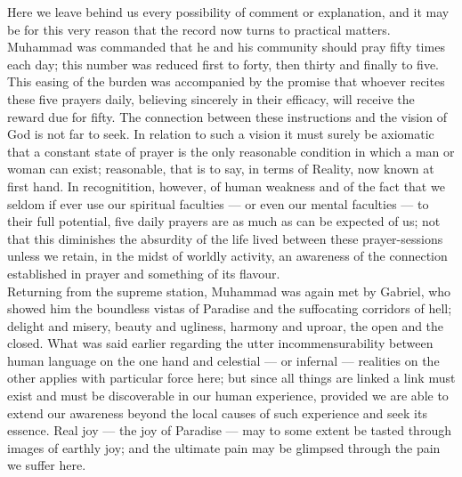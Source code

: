 \documentclass[11pt, b5paper, twoside]{book}
\begin{document}
Here we leave behind us every possibility of comment or explanation, and it may be for this very 
reason that the record now turns to practical matters. Muhammad was commanded that he and his 
community should pray fifty times each day; this number was reduced first to forty, then thirty and 
finally to five. This easing of the burden was accompanied by the promise that whoever recites these 
five prayers daily, believing sincerely in their efficacy, will receive the reward due for fifty. The 
connection between these instructions and the vision of God is not far to seek. In relation to such a 
vision it must surely be axiomatic that a constant state of prayer is the only reasonable condition 
in which a man or woman can exist; reasonable, that is to say, in terms of Reality, now known at 
first hand. In recognitition, however, of human weakness and of the fact that we seldom if ever use 
our spiritual faculties --- or even our mental faculties --- to their full potential, five daily prayers 
are as much as can be expected of us; not that this diminishes the absurdity of the life lived 
between these prayer-sessions unless we retain, in the midst of worldly activity, an awareness of the 
connection established in prayer and something of its flavour. \\

Returning from the supreme station, Muhammad was again met by Gabriel, who showed him the boundless vistas of Paradise and the suffocating corridors of hell; delight and misery, beauty and ugliness, 
harmony and uproar, the open and the closed. What was said earlier regarding the utter 
incommensurability between human language on the one hand and celestial --- or infernal --- realities on 
the other applies with particular force here; but since all things are linked a link must exist and 
must be discoverable in our human experience, provided we are able to extend our awareness beyond the 
local causes of such experience and seek its essence. Real joy --- the joy of Paradise --- may to some 
extent be tasted through images of earthly joy; and the ultimate pain may be glimpsed through the 
pain we suffer here. \\
\end{document}
